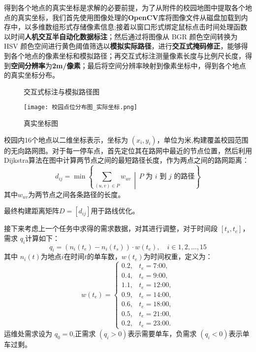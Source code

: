 \documentclass[withoutpreface,bwprint]{cumcmthesis}
\begin{document}
得到各个地点的真实坐标是求解的必要前提，为了从附件的校园地图中提取各个地点的真实坐标，我们首先使用图像处理的\textbf{OpenCV}库将图像文件从磁盘加载到内存中，以多维数组形式存储像素信息;接着以窗口形式绑定鼠标点击时间处理函数以时间\textbf{人机交互半自动化数据标注}；然后通过将图像从 BGR 颜色空间转换为 HSV 颜色空间进行黄色阈值筛选以\textbf{模拟实际路径}，进行\textbf{交互式掩码修正}，能够得到各个地点的像素坐标和模拟路径；再交互式标注测量像素长度与比例尺长度，得到\textbf{空间分辨率}为\textbf{2m/像素}；最后将空间分辨率映射到像素坐标中，得到各个地点的真实坐标分布。


\begin{figure}[H]
    \centering
    \hfill %
    \label{fig:side-by-side}
    \caption{交互式标注与模拟路径图}\label{fig:交互式标注与模拟路径图}
\end{figure}

\begin{figure}
    \centering
    \texttt{[image: 校园点位分布图\_实际坐标.png]}
    \caption{真实坐标图}
    \label{fig:enter-label}
\end{figure}

校园内16个地点以二维坐标表示，坐标为 $(x_i, y_i)$，单位为米,构建覆盖校园范围的无向路网图。对于每一停车点，首先定位其在路网中最近的节点位置，然后利用 Dijkstra算法在图中计算两节点之间的最短路径长度，作为两点之间的路网距离：
\begin{equation}
    d_{ij} = \min \left\{ \sum_{(u,v) \in P} w_{uv} \,\middle|\, P \text{ 为 } i \text{ 到 } j \text{ 的路径} \right\}
\end{equation}
其中$w_{uv}$为两节点之间各条路径的长度。

最终构建距离矩阵$D = [d_{ij}]$\label{距离矩阵}用于路线优化。

接下来考虑上一个任务中求得的需求数据，对其进行调整，对于时间段 $[t_s, t_e]$，需求 $q_i$计算如下：
\begin{equation}
    q_i = (n_i(t_e) - n_i(t_s)) \cdot w(t_e), \quad i \in {1, 2, \dots, 15}
\end{equation}
其中 $n_i(t)$为地点$i$在时间$t$的单车数，$w(t_e)$为时间权重，定义为：
\[
w(t_e) = 
\begin{cases}
0.2, & t_e = \text{7:00}, \\
0.4, & t_e = \text{9:00}, \\
1.1, & t_e = \text{12:00}, \\
0.9, & t_e = \text{14:00}, \\
0.6, & t_e = \text{18:00}, \\
0.5, & t_e = \text{21:00}, \\
0.2, & t_e = \text{23:00}.
\end{cases}
\]
运维处需求设为 $q_0 = 0$,正需求 $( q_i > 0 )$表示需要单车，负需求 $( q_i < 0 )$表示单车过剩。
\end{document}
